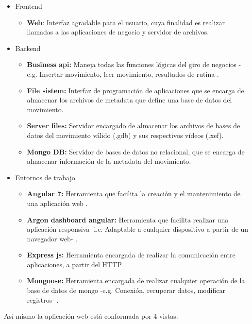 \begin{itemize}
\item Frontend
	\begin{itemize}
	\item \textbf{Web}: Interfaz agradable para el usuario, cuya finalidad es realizar llamadas a las aplicaciones de negocio y servidor de archivos.
	\end{itemize}
\item Backend
	\begin{itemize}
	\item \textbf{Business api:} Maneja todas las  funciones l\'ogicas del giro de negocios -e.g. Insertar movimiento, leer movimiento, resultados de rutina-.
	\item \textbf{File sistem:} Interfaz de programaci\'on de aplicaciones que se encarga de almacenar los archivos de metadata que define una base de datos del movimiento.
		\item \textbf{Server files:} Servidor encargado de almacenar los archivos de bases de datos del movimiento v\'alido (.gdb) y sus respectivos v\'ideos (.xef).
		\item \textbf{Mongo DB:} Servidor de bases de datos no relacional, que se encarga de almacenar informaci\'on de la metadata del movimiento.
	\end{itemize}
\item Entornos de trabajo
\begin{itemize}
\item \textbf{Angular 7:} Herramienta que facilita la creaci\'on y el mantenimiento de una aplicaci\'on web \cite{angular2019}.
\item \textbf{Argon dashboard angular:} Herramienta  que facilita realizar una aplicaci\'on responsiva -i.e. Adaptable a cualquier dispositivo a partir de un navegador web- \cite{argonDash}.
\item \textbf{Express js:} Herramienta encargada de realizar la comunicaci\'on entre aplicaciones, a partir del \acrlong{HTTP} \cite{fileSistem2019}.
\item \textbf{Mongoose:} Herramienta encargada de realizar cualquier operaci\'on de la base de datos de mongo -e.g. Conexi\'on, recuperar datos, modificar registros- \cite{mongoose2019}.
\end{itemize}
\end{itemize}
As\'i mismo la aplicaci\'on web est\'a conformada por 4 vistas:
